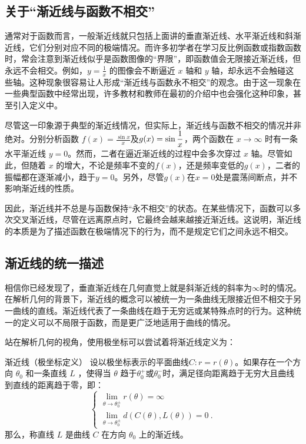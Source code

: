 \subsection{关于“渐近线与函数不相交”}

通常对于函数而言，一般渐近线就只包括上面讲的垂直渐近线、水平渐近线和斜渐近线，它们分别对应不同的极端情况。而许多初学者在学习反比例函数或指数函数时，常会注意到渐近线似乎是函数图像的“界限”，即函数值会无限接近渐近线，但永远不会相交。例如，$\displaystyle y = \frac{1}{x}$ 的图像会不断逼近 $x$ 轴和 $y$ 轴，却永远不会触碰这些轴。这种现象很容易让人形成“渐近线与函数永不相交”的观念。由于这一现象在一些典型函数中经常出现，许多教材和教师在最初的介绍中也会强化这种印象，甚至引入定义中。

尽管这一印象源于典型的渐近线情况，但实际上，渐近线与函数不相交的情况并非绝对。分别分析函数 $\displaystyle f(x) = \frac{\sin x}{x}$及$\displaystyle g(x)=\sin {1\over x}$，两个函数在 $x \to \infty$ 时有一条水平渐近线 $y = 0$。然而，二者在逼近渐近线的过程中会多次穿过 $x$ 轴。尽管如此，但随着 $x$ 的增大，不论是频率不变的$f(x)$，还是频率变低的$g(x)$，二者的振幅都在逐渐减小，趋于$y = 0$。另外，尽管$g(x)$在$x=0$处是震荡间断点，并不影响渐近线的性质。

因此，渐近线并不总是与函数保持“永不相交”的状态。在某些情况下，函数可以多次交叉渐近线，尽管在远离原点时，它最终会越来越接近渐近线。这说明，渐近线的本质是为了描述函数在极端情况下的行为，而不是规定它们之间永远不相交。

\subsection{渐近线的统一描述}

相信你已经发现了，垂直渐近线在几何直觉上就是斜渐近线的斜率为$\infty$时的情况。在解析几何的背景下，渐近线的概念可以被统一为一条曲线无限接近但不相交于另一曲线的直线。渐近线代表了一条曲线在趋于无穷远或某特殊点时的行为。这种统一的定义可以不局限于函数，而是更广泛地适用于曲线的情况。

站在解析几何的视角，使用极坐标可以尝试着将渐近线定义为：

\begin{definition}{渐近线（极坐标定义）}
设以极坐标表示的平面曲线$C:r=r(\theta)$。如果存在一个方向  $\theta_0$  和一条直线  $L$ ，使得当  $\theta$  趋于$\theta_0^+$或$\theta_0^-$时，满足径向距离趋于无穷大且曲线到直线的距离趋于零，即：
\begin{equation}
\begin{cases}
\displaystyle\lim_{\theta \to \theta^\pm_0} r(\theta) = \infty\\
\displaystyle\lim_{\theta \to \theta^\pm_0} d\left(C(\theta), L(\theta)\right) = 0~.
\end{cases}
\end{equation}
那么，称直线  $L$  是曲线  $C$  在方向  $\theta_0$  上的渐近线。
\end{definition}

